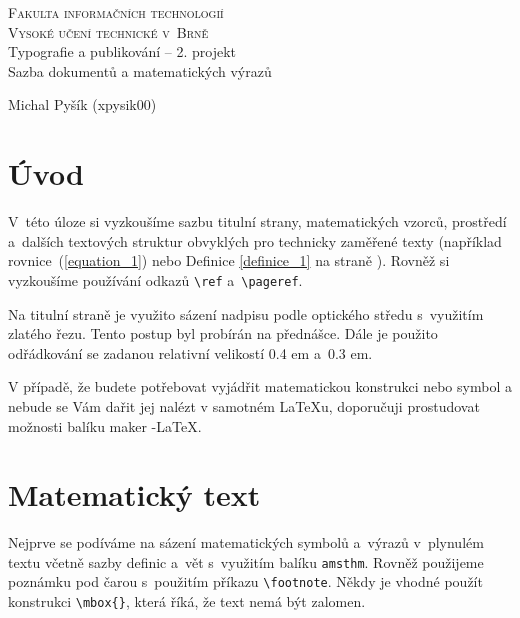 \documentclass[twocolumn, a4paper, 11pt]{article}
\theoremstyle{definition}
\theoremstyle{plain}
\begin{document}
\begin{titlepage}

\begin{center}
    \textsc{\Huge Fakulta informačních technologií\\Vysoké učení technické v~Brně\\}
    \LARGE{Typografie a publikování -- 2. projekt\\Sazba dokumentů a matematických výrazů}
\end{center}

\Large{\the\year\hfill Michal Pyšík (xpysik00)}

\end{titlepage}


\section*{Úvod}
V~této úloze si vyzkoušíme sazbu titulní strany, matematických vzorců, prostředí a~dalších textových struktur obvyklých pro technicky zaměřené texty (například rovnice~(\ref{equation_1})
nebo Definice \ref{definice_1} na straně \pageref{definice_1}). Rovněž si vyzkoušíme používání odkazů \verb|\ref| a~\verb|\pageref|.

Na titulní straně je využito sázení nadpisu podle optického středu s~využitím zlatého řezu. Tento postup byl
probírán na přednášce. Dále je použito odřádkování se
zadanou relativní velikostí 0.4 em a~0.3 em.

V případě, že budete potřebovat vyjádřit matematickou
konstrukci nebo symbol a nebude se Vám dařit jej nalézt
v samotném \LaTeX u, doporučuji prostudovat možnosti balíku maker \AmS -\LaTeX.


\section{Matematický text}
Nejprve se podíváme na sázení matematických symbolů
a~výrazů v~plynulém textu včetně sazby definic a~vět s~využitím balíku \verb|amsthm|.
Rovněž použijeme poznámku pod čarou s~použitím příkazu \verb|\footnote|.
Někdy je vhodné použít konstrukci \verb|\mbox{}|, která říká, že text nemá být zalomen.
\end{document}
